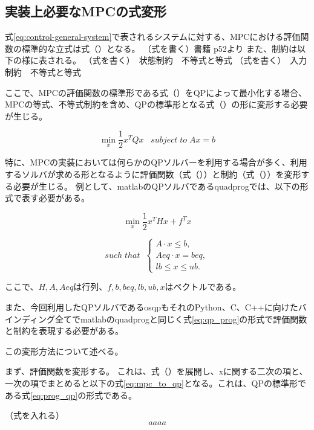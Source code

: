 \subsection{実装上必要なMPCの式変形}
式\eqref{eq:control-general-system}で表されるシステムに対する、MPCにおける評価関数の標準的な立式は式（）となる。
（式を書く）書籍 p52より
また、制約は以下の様に表される。
（式を書く）　状態制約　不等式と等式
（式を書く）　入力制約　不等式と等式

ここで、MPCの評価関数の標準形である式（）をQPによって最小化する場合、MPCの等式、不等式制約を含め、QPの標準形となる式（）の形に変形する必要が生じる。

\begin{equation}
  \underset{x}{\min} \frac{1}{2}x^TQx \;\;\; subject \; to \; Ax = b
\end{equation}

特に、MPCの実装においては何らかのQPソルバーを利用する場合が多く、利用するソルバが求める形となるように評価関数（式（））と制約（式（））を変形する必要が生じる。
例として、matlab\cite{MATLAB:2021}のQPソルバであるquadprog\cite{MATLABQUADPLOG}では、以下の形式で表す必要がある。

\begin{equation}
  \underset{x}{\min} \frac{1}{2}x^THx + f^Tx
  \label{eq:qp_prog}
\end{equation}

\begin{equation}
  such \; that \;\;
  \begin{cases}
    A \cdot x \leq b,  \\
    Aeq \cdot x = beq, \\
    lb \leq x \leq ub.
  \end{cases}
  \label{eq:qp_constraint}
\end{equation}

ここで、$H,A,Aeq$は行列、$f,b,beq,lb,ub,x$はベクトルである。

また、今回利用したQPソルバであるosqp\cite{OSQP}もそれのPython、C、C++に向けたバインディング全てでmatlabのquadprogと同じく式\eqref{eq:qp_prog}の形式で評価関数と制約を表現する必要がある。

この変形方法について述べる。

まず、評価関数を変形する。
これは、式（）を展開し、xに関する二次の項と、一次の項でまとめると以下の式\eqref{eq:mpc_to_qp}となる。これは、QPの標準形である式\eqref{eq:prog_qp}の形式である。

（式を入れる）
\begin{equation}
  aaaa
  \label{eq:mpc_to_qp}
\end{equation}

